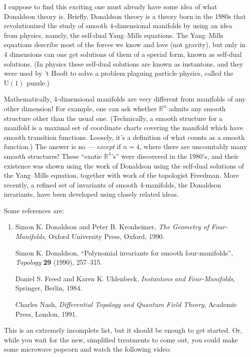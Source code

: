 \documentclass{article}
\begin{document}
I suppose to find this exciting one must already have some idea of what
Donaldson theory is. Briefly, Donaldson theory is a theory born in the
1980s that revolutionized the study of smooth \(4\)-dimensional
manifolds by using an idea from physics, namely, the self-dual
Yang--Mills equations. The Yang--Mills equations describe most of the
forces we know and love (not gravity), but only in 4 dimensions can one
get solutions of them of a special form, known as self-dual solutions.
(In physics these self-dual solutions are known as instantons, and they
were used by 't Hooft to solve a problem plaguing particle physics,
called the \(\mathrm{U}(1)\) puzzle.)

Mathematically, \(4\)-dimensional manifolds are very different from
manifolds of any other dimension! For example, one can ask whether
\(\mathbb{R}^n\) admits any smooth structure other than the usual one.
(Technically, a smooth structure for a manifold is a maximal set of
coordinate charts covering the manifold which have smooth transition
functions. Loosely, it's a definition of what counts as a smooth
function.) The answer is no --- \emph{except} if \(n = 4\), where
there are uncountably many smooth structures! These ``exotic
\(\mathbb{R}^4\)'s'' were discovered in the 1980's, and their existence
was shown using the work of Donaldson using the self-dual solutions of
the Yang--Mills equation, together with work of the topologist Freedman.
More recently, a refined set of invariants of smooth 4-manifolds, the
Donaldson invariants, have been developed using closely related ideas.

Some references are:

\begin{enumerate}
\def\labelenumi{\arabic{enumi})}
\item
  Simon K. Donaldson and Peter B. Kronheimer, \emph{The Geometry of Four-Manifolds}, 
  Oxford University Press, Oxford, 1990.

  Simon K.  Donaldson, ``Polynomial invariants for smooth four-manifolds'', 
  \emph{Topology} \textbf{29} (1990), 257--315.

  Daniel S. Freed and Karen K. Uhlenbeck, \emph{Instantons and 
  Four-Manifolds}, Springer, Berlin, 1984.

  Charles Nash, \emph{Differential Topology and Quantum Field Theory}, 
  Academic Press, London, 1991.
\end{enumerate}

This is an extremely incomplete list, but it should be enough to get
started. Or, while you wait for the new, simplified treatments to come
out, you could make some microwave popcorn and watch the following
video:
\end{document}
